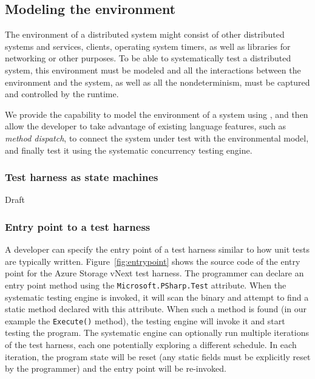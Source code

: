 \subsection{Modeling the environment}
\label{sec:method:model}

The environment of a distributed system might consist of other distributed systems and services, clients, operating system timers, as well as libraries for networking or other purposes. To be able to systematically test a distributed system, this environment must be modeled and all the interactions between the environment and the system, as well as all the nondeterminism, must be captured and controlled by the \psharp runtime.

We provide the capability to model the environment of a system using \psharp, and then allow the developer to take advantage of existing language features, such as \emph{method dispatch}, to connect the system under test with the environmental model, and finally test it using the \psharp systematic concurrency testing engine.

\subsubsection{Test harness as \psharp state machines}
\label{sec:method:model:harness}

Draft

\subsubsection{Entry point to a \psharp test harness}
\label{sec:method:model:entrypoint}

A developer can specify the entry point of a \psharp test harness similar to how unit tests are typically written. Figure~\ref{fig:entrypoint} shows the source code of the entry point for the Azure Storage vNext \psharp test harness. The programmer can declare an entry point method using the \texttt{Microsoft.PSharp.Test} attribute. When the \psharp systematic testing engine is invoked, it will scan the binary and attempt to find a static method declared with this attribute. When such a method is found (in our example the \texttt{Execute()} method), the testing engine will invoke it and start testing the program. The systematic engine can optionally run multiple iterations of the test harness, each one potentially exploring a different schedule. In each iteration, the program state will be reset (any static fields must be explicitly reset by the programmer) and the entry point will be re-invoked.

